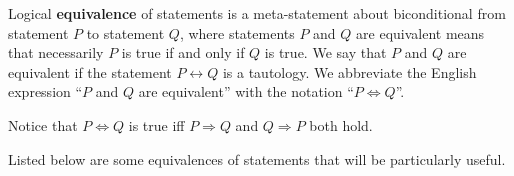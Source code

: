 \documentclass[]{article}
\begin{document}
\begin{defn}[Equivalence] Logical \textbf{equivalence} of statements is a meta-statement about biconditional from statement $P$ to statement $Q$, where statements $P$ and $Q$ are equivalent means that necessarily $P$ is true if and only if $Q$ is true. We say that $P$ and $Q$ are equivalent if the statement $P\leftrightarrow Q$ is a tautology. We abbreviate the English expression ``$P$ and $Q$ are equivalent'' with the notation ``$P\Leftrightarrow Q$''. 
\end{defn} 
\begin{rem} Notice that $P \Leftrightarrow Q$ is true iff $P \Rightarrow Q$ and $Q \Rightarrow P$ both hold.
\end{rem}
Listed below are some equivalences of statements that will be particularly useful.
\end{document}
